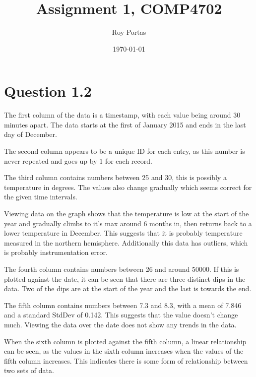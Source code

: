 

\title{Assignment 1, COMP4702}
\author{Roy Portas}
\date{\today}



\begin{titlepage}
    \maketitle
\end{titlepage}

\section*{Question 1.2}

The first column of the data is a timestamp, with each value being around 30 minutes apart. The data starts at the first of January 2015 and ends in the last day of December.

The second column appears to be a unique ID for each entry, as this number is never repeated and goes up by 1 for each record.

The third column contains numbers between 25 and 30, this is possibly a
temperature in degrees. The values also change gradually which seems correct for the given time intervals. 

Viewing data on the graph shows that the temperature is low at the start of the year and gradually climbs to it's max around 6 months in, then returns back to a lower temperature in December. This suggests that it is probably temperature measured in the northern hemisphere. Additionally this data has outliers, which is probably instrumentation error.

The fourth column contains numbers between 26 and around 50000. If this is plotted against the date, it can be seen that there are three distinct dips in the data. Two of the dips are at the start of the year and the last is towards the end.

The fifth column contains numbers between 7.3 and 8.3, with a mean of 7.846 and a standard StdDev of 0.142. This suggests that the value doesn't change much. Viewing the data over the date does not show any trends in the data.

When the sixth column is plotted against the fifth column, a linear relationship can be seen, as the values in the sixth column increases when the values of the fifth column increases. This indicates there is some form of relationship between two sets of data.

